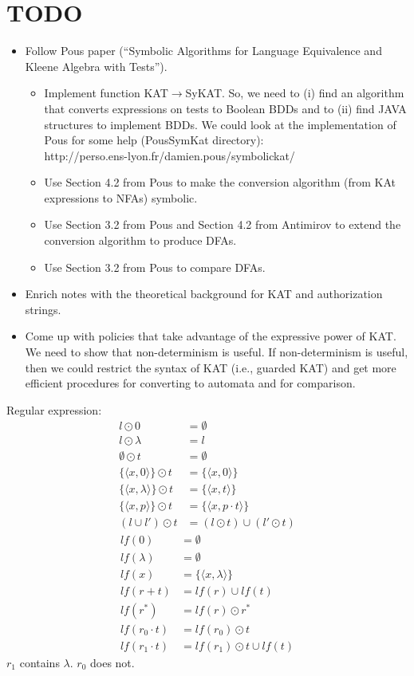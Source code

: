 \documentclass[10pt]{article}
\begin{document}
\section*{TODO}
\begin{itemize}
\item Follow Pous paper (``Symbolic Algorithms for Language Equivalence and Kleene Algebra with Tests'').
\begin{itemize}
\item Implement function KAT$\rightarrow$SyKAT. So, we need to (i) find an algorithm that converts expressions on tests to Boolean BDDs and to (ii) find JAVA structures to implement BDDs. We could look at the implementation of Pous for some help (PousSymKat directory):\\
http://perso.ens-lyon.fr/damien.pous/symbolickat/
\item Use Section 4.2 from Pous to make the conversion algorithm (from KAt expressions to NFAs) symbolic.
\item Use Section 3.2 from Pous and Section 4.2 from Antimirov to extend the conversion algorithm to produce DFAs.
\item Use Section 3.2 from Pous to compare DFAs.
\end{itemize}  
\item Enrich notes with the theoretical background for KAT and authorization strings.
\item Come up with policies that take advantage of the expressive power of KAT. We need to show that non-determinism is useful. If non-determinism is useful, then we could restrict the syntax of KAT (i.e., guarded KAT) and get more efficient procedures for converting to automata and for comparison.
\end{itemize}
\newpage
\begin{minipage}{0.45\textwidth}
Regular expression:\\
\begin{align*}
    l\odot 0&=\emptyset\\
    l\odot \lambda&= l\\
    \emptyset\odot t&=\emptyset\\
    \{\langle x,0\rangle\}\odot t&=\{\langle x,0\rangle\}\\
    \{\langle x,\lambda\rangle\}\odot t&=\{\langle x,t\rangle\}\\
    \{\langle x,p\rangle\}\odot t&=\{\langle x,p\cdot t\rangle\}\\
    (l\cup l')\odot t&=(l\odot t)\cup (l'\odot t)
\end{align*}
\begin{align*}
    lf(0)&=\emptyset\\
    lf(\lambda)&=\emptyset\\
    lf(x)&=\{\langle x,\lambda\rangle\}\\
    lf(r+t)&=lf(r)\cup lf(t)\\
    lf(r^*)&=lf(r)\odot r^*\\
    lf(r_0\cdot t)&=lf(r_0)\odot t\\
    lf(r_1\cdot t)&=lf(r_1)\odot t\cup lf(t)
\end{align*}
$r_1$ contains $\lambda$. $r_0$ does not.
\end{minipage}%
\end{document}
